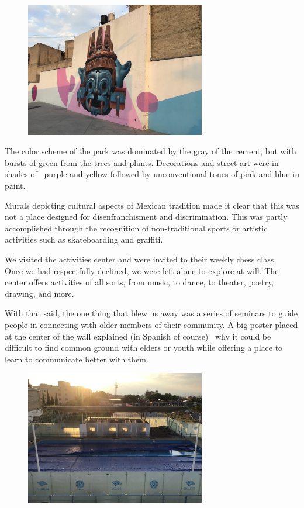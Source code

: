 \documentclass[letter]{ourGreenwayBrand}
\begin{document}
\begin{figure}[htbp]
  \centering
  \includegraphics[width=0.7\textwidth]{images/Untitled-1.png}
\end{figure}

The color scheme of the park was dominated by the gray of the cement, but with bursts of green from the trees and plants. Decorations and street art were in shades of  purple and yellow followed by unconventional tones of pink and blue in paint.

Murals depicting cultural aspects of Mexican tradition made it clear that this was not a place designed for disenfranchisment and discrimination. This was partly accomplished through the recognition of non-traditional sports or artistic activities such as skateboarding and graffiti.

We visited the activities center and were invited to their weekly chess class.  Once we had respectfully declined, we were left alone to explore at will. The center offers activities of all sorts, from music, to dance, to theater, poetry, drawing, and more.

With that said, the one thing that blew us away was a series of seminars to guide people in connecting with older members of their community. A big poster placed at the center of the wall explained (in Spanish of course)  why it could be difficult to find common ground with elders or youth while offering a place to learn to communicate better with them.

\begin{figure}[htbp]
  \centering
  \includegraphics[width=0.7\textwidth]{images/Untitled_copy.png}
\end{figure}
\end{document}
